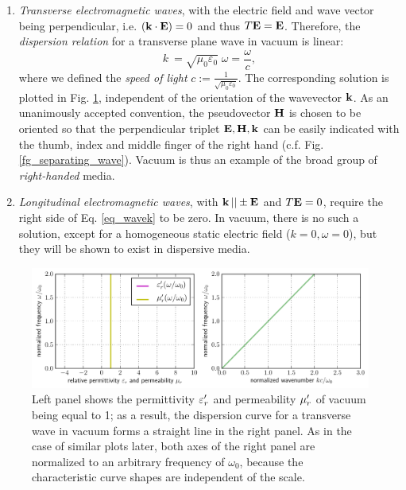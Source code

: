 \begin{enumerate}
 \item{\textit{Transverse electromagnetic waves}, with the electric field and wave vector being perpendicular, i.e. $({\mathbf{k}} \cdot \mathbf{E}) = 0$ and thus $T\mathbf{E} = \mathbf{E}$. Therefore, the \textit{dispersion relation} for a transverse plane wave in vacuum is linear:
\begin{equation} k~= \sqrt{\mu_0 \varepsilon_0}\; \omega = \frac{\omega}{c}, \label{eq_dispeq_vac}\end{equation}
	where we defined the \textit{speed of light} $c := \frac{1}{\sqrt{\mu_0 \varepsilon_0}}$. The corresponding solution is plotted in Fig. \ref{fg_dcvac}, independent of the orientation of the wavevector ${\mathbf{k}}$. As an unanimously accepted convention, the pseudovector $\mathbf{H}$ is chosen to be oriented so that the perpendicular triplet $\mathbf{E},\mathbf{H},{\mathbf{k}}$ can be easily indicated with the thumb, index and middle finger of the right hand (c.f. Fig. \ref{fg_separating_wave}). Vacuum is thus an example of the broad group of \textit{right-handed} media.
} 
 \item{\textit{Longitudinal electromagnetic waves}, with ${\mathbf{k}}\,|| \pm \mathbf{E}$ and $T\mathbf{E} = 0$, require the right side of Eq. \ref{eq_wavek} to be zero. In vacuum, there is no such a solution, except for a homogeneous static electric field ($k = 0, \omega = 0$), but they will be shown to exist in dispersive media.} 
 \end{enumerate}
 \begin{figure}[t] \caption{Left panel shows the permittivity $\varepsilon_r'$ and permeability $\mu_r'$ of vacuum being equal to 1; as a result, the dispersion curve for a transverse wave in vacuum forms a straight line in the right panel. As in the case of similar plots later, both axes of the right panel are normalized to an arbitrary frequency of $\omega_0$, because the characteristic curve shapes are independent of the scale.} \label{fg_dcvac} \centering 
	\includegraphics[width=\textwidth]{img/dispersion_landau_lifshitz/dispersion_vacuum.pdf}
\end{figure}

